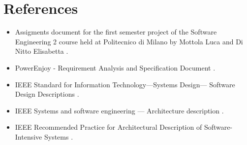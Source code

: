 \section{References}

\begin{itemize}
	\item Assigments document for the first semester project of the Software Engineering 2 course held at Politecnico di Milano by Mottola Luca and Di Nitto Elisabetta \cite{assignments}.
	\item PowerEnjoy - Requirement Analysis and Specification Document \cite{rasd}.
	\item IEEE Standard for Information Technology—Systems Design— Software Design Descriptions \cite{ieee_sdd}.
	\item IEEE Systems and software engineering — Architecture description \cite{ieee_arch}.
	\item IEEE Recommended Practice for Architectural Description of Software-Intensive Systems \cite{ieee1471}.
\end{itemize}
